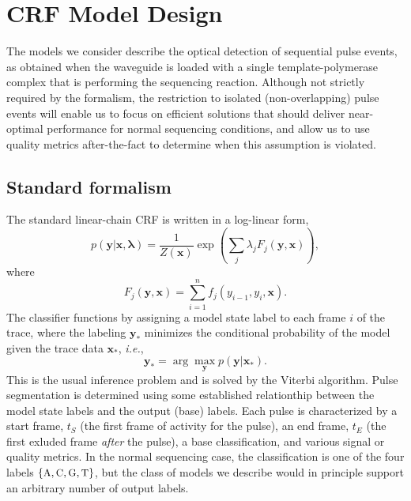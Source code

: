 \documentclass[10pt]{article}
\newcommand{\ie}{\emph{i.e.}}
\newcommand{\crf}{{\small CRF}}
\newcommand{\fA}{\ensuremath{\text{\small{A}}}}
\newcommand{\fC}{\ensuremath{\text{\small{C}}}}
\newcommand{\fG}{\ensuremath{\text{\small{G}}}}
\newcommand{\fT}{\ensuremath{\text{\small{T}}}}
\begin{document}
\section{CRF Model Design}
\label{sec:model_design}

The models we consider describe the optical detection of sequential pulse events, as obtained when the waveguide is loaded with a single template-poly\-merase complex that is performing the sequencing reaction.
Although not strictly required by the formalism, the restriction to isolated (non-overlapping) pulse events will enable us to focus on efficient solutions that should deliver near-optimal performance for normal sequencing conditions, and allow us to use quality metrics after-the-fact to determine when this assumption is violated.

\subsection{Standard formalism}
The standard linear-chain \crf{} is written in a log-linear form,
\begin{equation}
\label{eq:crf_cond_prob}
p(\mathbf{y}|\mathbf{x},\mathbf{\lambda}) = \frac{1}{Z(\mathbf{x})} \exp(\sum_j \lambda_j F_j(\mathbf{y},\mathbf{x})),
\end{equation}  
where
\begin{equation}
\label{eq:feat_func_form}
F_j(\mathbf{y},\mathbf{x}) = \sum_{i=1}^n f_j(y_{i-1},y_i,\mathbf{x}).
\end{equation}
The classifier functions by assigning a model state label to each frame $i$ of the trace, where the labeling $\mathbf{y_*}$ minimizes the conditional probability of the model given the trace data $\mathbf{x_*}$, \ie,
\begin{equation}
\label{eq:arg_max}
\mathbf{y_*} = \arg \max_\mathbf{y} p(\mathbf{y}|\mathbf{x_*}).
\end{equation}
This is the usual inference problem and is solved by the Viterbi algorithm.
Pulse segmentation is determined using some established relationthip between the model state labels and the output (base) labels. Each pulse is characterized by a start frame, $t_S$ (the first frame of activity for the pulse), an end frame, $t_E$ (the first exluded frame \emph{after} the pulse), a base classification, and various signal or quality metrics.
In the normal sequencing case, the classification is one of the four labels $\{\fA, \fC, \fG, \fT\}$, but the class of models we describe would in principle support an arbitrary number of output labels.
\end{document}
